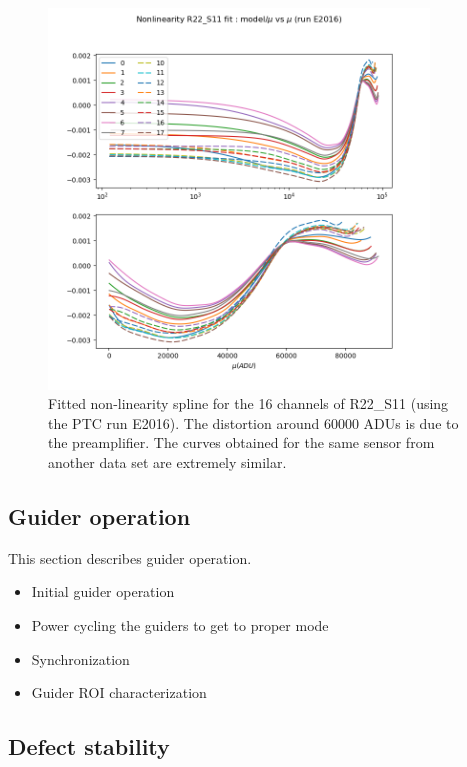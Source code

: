 \begin{figure}
\begin{centering}
\includegraphics[width=0.9\textwidth]{figures/E2016_nonlin_model.png}
\end{centering}
\caption{Fitted non-linearity spline for the 16 channels of R22\_S11 (using the PTC run E2016). The distortion around 60000 ADUs is due to the preamplifier. The curves obtained for the same sensor from another data set are extremely similar. \label{fig:nonlin_model}}


\end{figure}



\subsection{Guider operation}\label{guider-operation}

This section describes guider operation.

\begin{itemize}
\tightlist
\item
  Initial guider operation
\item
  Power cycling the guiders to get to proper mode
\item
  Synchronization
\item
  Guider ROI characterization
\end{itemize}

\subsection{Defect stability}\label{defect-stability}

